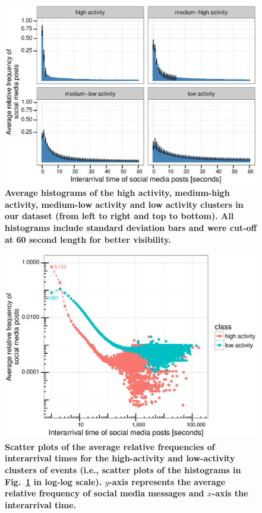 \documentclass[10pt,letterpaper]{article}
\begin{document}


\begin{figure}
  \centering
    \includegraphics[width=\textwidth]{figures/plots_revision/fig4}
  \caption{\textbf{Average histograms of the high activity,
      medium-high activity, medium-low activity and low activity
      clusters in our dataset (from left to right and top to
      bottom). All histograms include standard deviation bars and were
      cut-off at 60 second length for better visibility.
    }}\label{fig:fig4}
\end{figure}

\begin{figure}
  \centering
    \includegraphics[width=\textwidth]{figures/plots_revision/fig5}
  \caption{\textbf{Scatter plots of the average relative frequencies of interarrival times
for the high-activity and low-activity clusters of events (i.e., scatter
plots of the histograms in Fig.~\ref{fig:fig4} in log-log scale). $y$-axis
represents the average relative frequency of social media messages and
$x$-axis the interarrival time.
    }}\label{fig:fig5}
\end{figure}
\end{document}
